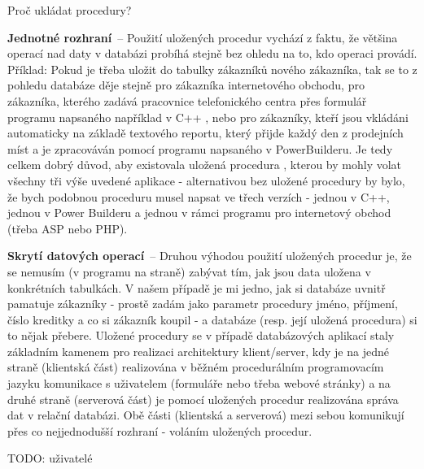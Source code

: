 \begin{obecne}{Proč ukládat procedury?}
  \begin{pitemize}
      \item \textbf{Jednotné rozhraní}~-- Použití uložených procedur vychází z
      faktu, že většina operací nad daty v databázi probíhá stejně bez ohledu na
      to, kdo operaci provádí. Příklad: Pokud je třeba uložit do tabulky
      zákazníků nového zákazníka, tak se to z pohledu databáze děje stejně pro
      zákazníka internetového obchodu, pro zákazníka, kterého zadává pracovnice
      telefonického centra přes formulář programu napsaného například v C++ ,
      nebo pro zákazníky, kteří jsou vkládáni automaticky na základě textového
      reportu, který přijde každý den z  prodejních míst a je
      zpracováván pomocí programu napsaného v PowerBuilderu. Je tedy celkem
      dobrý důvod, aby existovala uložená procedura ,
      kterou by mohly volat všechny tři výše uvedené aplikace - alternativou bez
      uložené procedury by bylo, že bych podobnou proceduru musel napsat ve
      třech verzích - jednou v C++, jednou v Power Builderu a jednou v rámci
      programu pro internetový obchod (třeba ASP nebo PHP). 
      \item \textbf{Skrytí datových operací}~-- Druhou výhodou použití uložených
      procedur je, že se nemusím (v programu na  straně) zabývat
      tím, jak jsou data uložena v konkrétních tabulkách. V našem případě je mi
      jedno, jak si databáze uvnitř pamatuje zákazníky - prostě zadám jako
      parametr procedury jméno, příjmení, číslo kreditky a co si zákazník koupil
      - a databáze (resp. její uložená procedura) si to nějak přebere. Uložené
      procedury se v případě databázových aplikací staly základním kamenem pro
      realizaci architektury klient/server, kdy je na jedné straně (klientská
      část) realizována v běžném procedurálním programovacím jazyku komunikace s
      uživatelem (formuláře nebo třeba webové stránky) a na druhé straně
      (serverová část) je pomocí uložených procedur realizována správa dat v
      relační databázi. Obě části (klientská a serverová) mezi sebou komunikují
      přes co nejjednodušší rozhraní - voláním uložených procedur. 
  \end{pitemize}
\end{obecne}

TODO: uživatelé

